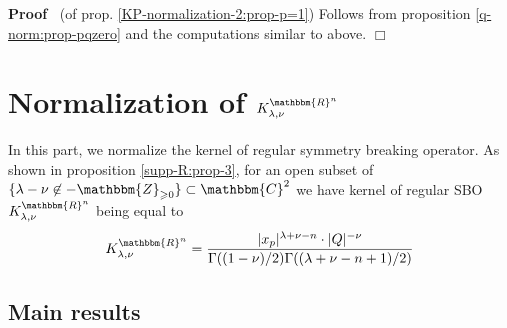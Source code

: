 \documentclass{article}
\newcommand{\nin}{\not\in}
\newcommand{\upl}{+}
\newenvironment{proof}{\noindent\textbf{Proof\ }}{\hspace*{\fill}$\Box$\medskip}
\numberwithin{definition}{section}
\numberwithin{lemma}{section}
\numberwithin{proposition}{section}
{\theorembodyfont{\rmfamily}\newtheorem{remark}{Remark}
\numberwithin{remark}{section}
}
\begin{document}
\begin{proof}
  (of prop. \ref{KP-normalization-2:prop-p=1}) Follows from proposition
  \ref{q-norm:prop-pqzero} and the computations similar to above.
\end{proof}

\section{Normalization of $K_{\lambda,
\nu}^{\mathbbm{R}^n}$}\label{sec:KR-normalization-even}

In this part, we normalize the kernel of regular symmetry breaking operator.
As shown in proposition \ref{supp-R:prop-3}, for an open subset of $\{ \lambda
- \nu \nin -\mathbbm{Z}_{\geqslant 0} \} \subset \mathbbm{C}^2$ we have kernel
of regular SBO $K_{\lambda, \nu}^{\mathbbm{R}^n}$ being equal to
\begin{equation}
  K_{\lambda, \nu}^{\mathbbm{R}^n} = \frac{| x_p |^{\lambda + \nu - n} \cdot |
  Q |^{- \nu}}{\Gamma ( ( 1 - \nu) / 2) \Gamma ( ( \lambda + \nu - n \upl 1) /
  2)}
\end{equation}

\subsection{Main results}
\end{document}
